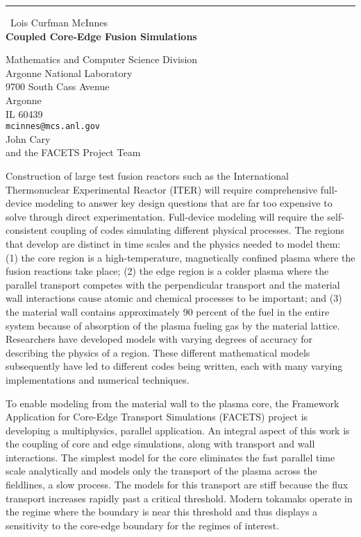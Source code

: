 \documentclass{report}
\begin{document}
\begin{center}
\rule{6in}{1pt} \
{\large Lois Curfman McInnes \\
{\bf Coupled Core-Edge Fusion Simulations}}

Mathematics and Computer Science Division \\ Argonne National Laboratory \\ 9700 South Cass Avenue \\ Argonne \\ IL 60439
\\
{\tt mcinnes@mcs.anl.gov}\\
John Cary\\
 and the FACETS Project Team\end{center}

Construction of large test fusion reactors such as the International
Thermonuclear Experimental Reactor (ITER) will require comprehensive
full-device modeling to answer key design questions that are far too
expensive to solve through direct experimentation. Full-device modeling
will require the self-consistent coupling of codes simulating different
physical processes. The regions that develop are distinct in time scales
and the physics needed to model them: (1) the core region is a
high-temperature, magnetically confined plasma where the fusion reactions
take place; (2) the edge region is a colder plasma where the parallel
transport competes with the perpendicular transport and the material wall
interactions cause atomic and chemical processes to be important; and (3)
the material wall contains approximately 90 percent of the fuel in the
entire system because of absorption of the plasma fueling gas by the
material lattice. Researchers have developed models with varying degrees
of accuracy for describing the physics of a region. These different
mathematical models subsequently have led to different codes being
written, each with many varying implementations and numerical techniques.

To enable modeling from the material wall to the plasma core, the
Framework Application for Core-Edge Transport Simulations (FACETS)
project is developing a multiphysics, parallel application. An integral
aspect of this work is the coupling of core and edge simulations, along
with transport and wall interactions. The simplest model for the core
eliminates the fast parallel time scale analytically and models only the
transport of the plasma across the fieldlines, a slow process. The models
for this transport are stiff because the flux transport increases rapidly
past a critical threshold. Modern tokamaks operate in the regime where
the boundary is near this threshold and thus displays a sensitivity to
the core-edge boundary for the regimes of interest.
\end{document}
